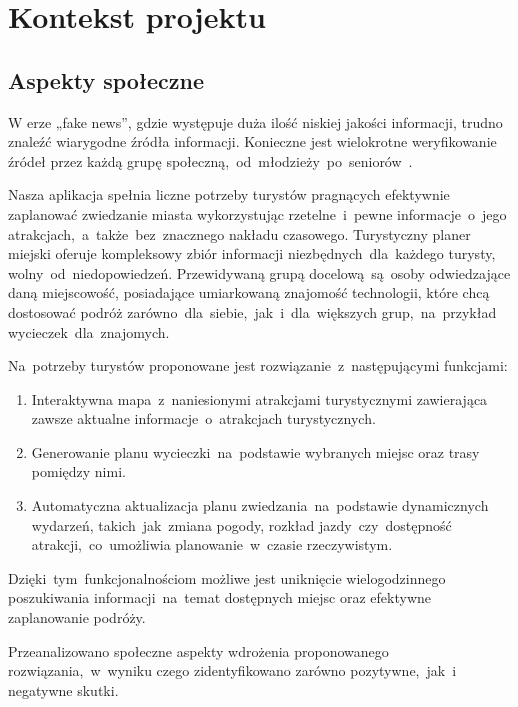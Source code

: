 
\chapter{Kontekst projektu}
\label{ch:kontekst-projektu}

\section{Aspekty społeczne}
\label{sec:aspekty-spoleczne}

W erze „fake news”, gdzie występuje duża ilość niskiej jakości informacji, trudno znaleźć wiarygodne źródła informacji.
Konieczne jest wielokrotne weryfikowanie źródeł przez każdą grupę społeczną,~od~młodzieży~po~seniorów~\cite{fakenews}.

\indent Nasza aplikacja spełnia liczne potrzeby turystów pragnących efektywnie zaplanować zwiedzanie miasta wykorzystując rzetelne~i~pewne informacje~o~jego atrakcjach,~a~także~bez~znacznego nakładu czasowego.
Turystyczny planer miejski oferuje kompleksowy zbiór informacji niezbędnych~dla~każdego turysty, wolny~od~niedopowiedzeń.
Przewidywaną grupą docelową~są~osoby odwiedzające daną miejscowość, posiadające umiarkowaną znajomość technologii, które chcą dostosować podróż zarówno~dla~siebie,~jak~i~dla~większych grup,~na~przykład wycieczek~dla~znajomych.

\indent Na~potrzeby turystów proponowane jest rozwiązanie~z~następującymi funkcjami:

\begin{enumerate}
    \item Interaktywna mapa~z~naniesionymi atrakcjami turystycznymi zawierająca zawsze aktualne informacje~o~atrakcjach turystycznych.
    \item Generowanie planu wycieczki~na~podstawie wybranych miejsc oraz trasy pomiędzy nimi.
    \item Automatyczna aktualizacja planu zwiedzania~na~podstawie dynamicznych wydarzeń, takich~jak~zmiana pogody, rozkład jazdy~czy~dostępność atrakcji,~co~umożliwia planowanie~w~czasie rzeczywistym.
\end{enumerate}

Dzięki~tym~funkcjonalnościom możliwe jest uniknięcie wielogodzinnego poszukiwania informacji~na~temat dostępnych miejsc oraz efektywne zaplanowanie podróży.

\indent Przeanalizowano społeczne aspekty wdrożenia proponowanego rozwiązania,~w~wyniku czego zidentyfikowano zarówno pozytywne,~jak~i negatywne skutki.

